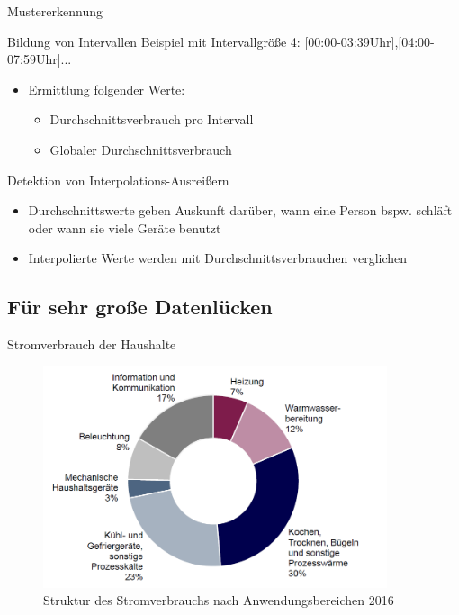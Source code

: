 \begin{frame}{Mustererkennung}
\begin{block}{Bildung von Intervallen}
\smallskip
\small{Beispiel mit Intervallgröße 4: [00:00-03:39Uhr],[04:00-07:59Uhr]...}\normalsize
\smallskip
\begin{itemize}
\item Ermittlung folgender Werte:
\begin{itemize}
\item Durchschnittsverbrauch pro Intervall
\item Globaler Durchschnittsverbrauch
\end{itemize}
\end{itemize}
\end{block}
\begin{block}{Detektion von Interpolations-Ausreißern}
\begin{itemize}
\item Durchschnittswerte geben Auskunft darüber, wann eine Person bspw. schläft oder wann sie viele Geräte benutzt
\item Interpolierte Werte werden mit Durchschnittsverbrauchen verglichen
\end{itemize}
\end{block}

\end{frame}


\subsection{Für sehr große Datenlücken}
\begin{frame}{Stromverbrauch der Haushalte}
\begin{figure}
  \centering
     \includegraphics[width=0.9\textwidth]{pics/avgEnergyConsumption.png}
  	\caption{Struktur des Stromverbrauchs nach Anwendungsbereichen 2016 \cite{bdew:consumption}}
  \label{fig:Bild1}
\end{figure}
\end{frame}

